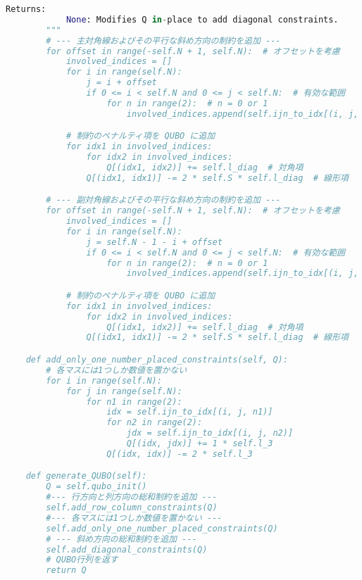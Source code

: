 \documentclass[uplatex,dvipdfmx,a4paper,11pt,oneside,openany]{jsbook}
\begin{document}
\begin{lstlisting}[language=Python]
        Returns:
            None: Modifies Q in-place to add diagonal constraints.
        """
        # --- 主対角線およびその平行な斜め方向の制約を追加 ---
        for offset in range(-self.N + 1, self.N):  # オフセットを考慮
            involved_indices = []
            for i in range(self.N):
                j = i + offset
                if 0 <= i < self.N and 0 <= j < self.N:  # 有効な範囲
                    for n in range(2):  # n = 0 or 1
                        involved_indices.append(self.ijn_to_idx[(i, j, n)])

            # 制約のペナルティ項を QUBO に追加
            for idx1 in involved_indices:
                for idx2 in involved_indices:
                    Q[(idx1, idx2)] += self.l_diag  # 対角項
                Q[(idx1, idx1)] -= 2 * self.S * self.l_diag  # 線形項

        # --- 副対角線およびその平行な斜め方向の制約を追加 ---
        for offset in range(-self.N + 1, self.N):  # オフセットを考慮
            involved_indices = []
            for i in range(self.N):
                j = self.N - 1 - i + offset
                if 0 <= i < self.N and 0 <= j < self.N:  # 有効な範囲
                    for n in range(2):  # n = 0 or 1
                        involved_indices.append(self.ijn_to_idx[(i, j, n)])

            # 制約のペナルティ項を QUBO に追加
            for idx1 in involved_indices:
                for idx2 in involved_indices:
                    Q[(idx1, idx2)] += self.l_diag  # 対角項
                Q[(idx1, idx1)] -= 2 * self.S * self.l_diag  # 線形項

    def add_only_one_number_placed_constraints(self, Q):
        # 各マスには1つしか数値を置かない
        for i in range(self.N):
            for j in range(self.N):
                for n1 in range(2):
                    idx = self.ijn_to_idx[(i, j, n1)]
                    for n2 in range(2):
                        jdx = self.ijn_to_idx[(i, j, n2)]
                        Q[(idx, jdx)] += 1 * self.l_3
                    Q[(idx, idx)] -= 2 * self.l_3

    def generate_QUBO(self):
        Q = self.qubo_init()
        #--- 行方向と列方向の総和制約を追加 ---
        self.add_row_column_constraints(Q)
        #--- 各マスには1つしか数値を置かない ---
        self.add_only_one_number_placed_constraints(Q)
        # --- 斜め方向の総和制約を追加 ---
        self.add_diagonal_constraints(Q)
        # QUBO行列を返す
        return Q


\end{lstlisting}
\end{document}
